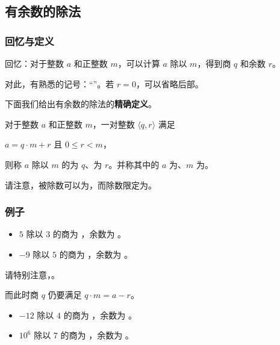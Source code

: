 \subsection{有余数的除法}
\begin{frame}[c]
  \progressnow*
\end{frame}
\begin{frame}
  \frametitle{回忆与定义}
  回忆：对于整数 $a$ 和正整数 $m$，可以计算 $a$ 除以 $m$，得到商 $q$ 和余数 $r$。
  
  对此，有熟悉的记号：“”。若 $r = 0$，可以省略后部。
  
  \emptyline
  下面我们给出有余数的除法的\textbf{精确定义}。
  \pause
  \begin{definition}[有余数的除法]
    对于整数 $a$ 和正整数 $m$，一对整数 $\langle q, r \rangle$ 满足
    \begin{center}
      $a = q \cdot m + r$ 且 $0 \le r < m$，
    \end{center}
    \pause
    则称 $a$ 除以 $m$ 的为 $q$、为 $r$。并称其中的 $a$ 为、$m$ 为。
  \end{definition}
  \pause
  请注意，被除数可以为，而除数限定为。
\end{frame}
\begin{frame}
  \frametitle{例子}
  \begin{itemize}
    \item $5$ 除以 $3$ 的商为 ，余数为 。
    \pause
    \pause
    \item $-9$ 除以 $5$ 的商为 ，余数为 。
  \end{itemize}
  \pause
  \pause
  请特别注意，。
  
  而此时商 $q$ 仍要满足 $q \cdot m = a - r$。
  \pause
  \begin{itemize}
    \item $-12$ 除以 $4$ 的商为 ，余数为 。
    \pause
    \pause
    \item ${10}^6$ 除以 $7$ 的商为 ，余数为 。
  \end{itemize}
\end{frame}
